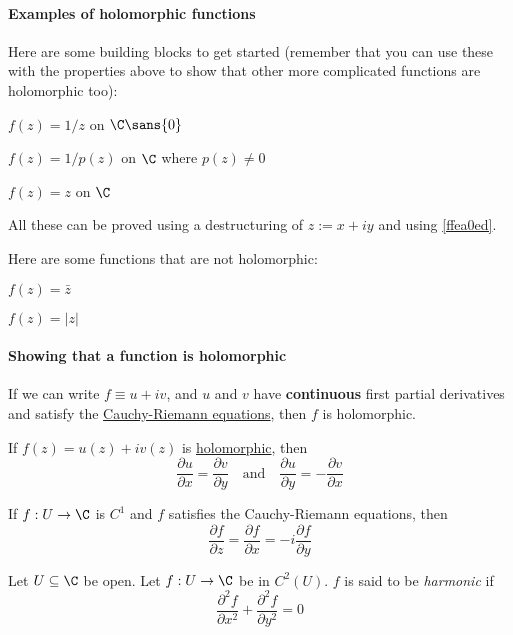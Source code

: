 \paragraph{Examples of holomorphic functions}

Here are some building blocks to get started (remember that you can use these
with the properties above to show that other more complicated functions are
holomorphic too):
\begin{enumerati}
  \item $f(z)=1/z$ on $\C\sans{0}$
  \item $f(z)=1/p(z)$ on $\C$ where $p(z)\neq0$
  \item $f(z)=z$ on $\C$
\end{enumerati}

All these can be proved using a destructuring of $z:=x+iy$ and using
\autoref{ffea0ed}.

Here are some functions that are not holomorphic:
\begin{enumerati}
  \item $f(z)=\bar z$
  \item $f(z)=|z|$
\end{enumerati}

\paragraph{Showing that a function is holomorphic}

If we can write $f\equiv u+iv$, and $u$ and $v$ have \textbf{continuous} first
partial derivatives and satisfy the \href{fb10fd3}{Cauchy-Riemann equations},
then $f$ is holomorphic.

\label{fb10fd3}

If $f(z) = u(z) + iv(z)$ is \href{e1e08f7}{holomorphic}, then
$$
  \frac{\partial u}{\partial x}=\frac{\partial v}{\partial y}
  \quad\text{and}\quad
  \frac{\partial u}{\partial y}=-\frac{\partial v}{\partial x}
$$

\Proposition{}\label{d507f47}

If $f:U\to\C$ is $C^1$ and $f$ satisfies the Cauchy-Riemann equations, then
$$
  \frac{\partial f}{\partial z}=\frac{\partial f}{\partial x}=
  -i\frac{\partial f}{\partial y}
$$

\label{d53f60f}

Let $U\subseteq\C$ be open. Let $f:U\to\C$ be in $C^2(U)$. $f$ is said to be
\textit{harmonic} if
$$
  \frac{\partial^2f}{\partial x^2}+\frac{\partial^2f}{\partial y^2}=0
$$

